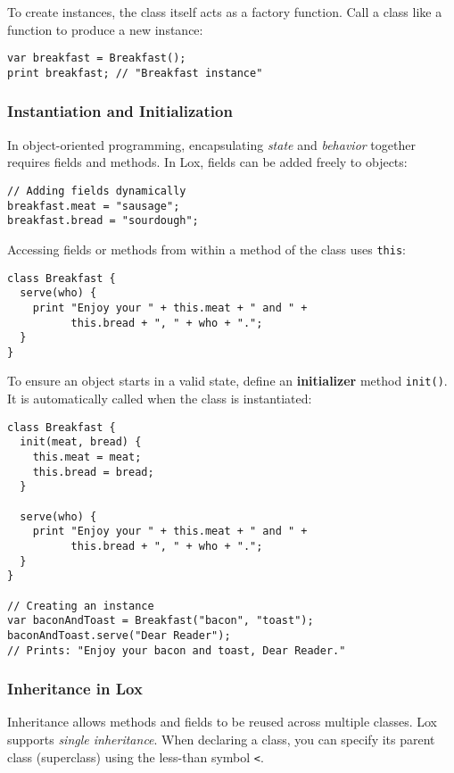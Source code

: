 \documentclass[12pt,a4paper]{article}
\newcommand{\newpar} {
  \vspace{1em}
  \noindent
}
\begin{document}
\newpar
To create instances, the class itself acts as a factory function. Call a class like a function to produce a new instance:

\begin{lstlisting}
var breakfast = Breakfast();
print breakfast; // "Breakfast instance"
\end{lstlisting}

\subsubsection*{Instantiation and Initialization}

In object-oriented programming, encapsulating \emph{state} and \emph{behavior} together requires fields and methods. In Lox, fields can be added freely to objects:

\begin{lstlisting}
// Adding fields dynamically
breakfast.meat = "sausage";
breakfast.bread = "sourdough";
\end{lstlisting}

\newpar
Accessing fields or methods from within a method of the class uses \texttt{this}:

\begin{lstlisting}
class Breakfast {
  serve(who) {
    print "Enjoy your " + this.meat + " and " +
          this.bread + ", " + who + ".";
  }
}
\end{lstlisting}

\newpar
To ensure an object starts in a valid state, define an \textbf{initializer} method \texttt{init()}. It is automatically called when the class is instantiated:

\begin{lstlisting}
class Breakfast {
  init(meat, bread) {
    this.meat = meat;
    this.bread = bread;
  }

  serve(who) {
    print "Enjoy your " + this.meat + " and " +
          this.bread + ", " + who + ".";
  }
}

// Creating an instance
var baconAndToast = Breakfast("bacon", "toast");
baconAndToast.serve("Dear Reader");
// Prints: "Enjoy your bacon and toast, Dear Reader."
\end{lstlisting}


\subsubsection*{Inheritance in Lox}

Inheritance allows methods and fields to be reused across multiple classes.
Lox supports \emph{single inheritance}.
When declaring a class, you can specify its parent class (superclass) using the
less-than symbol \texttt{<}.
\end{document}
